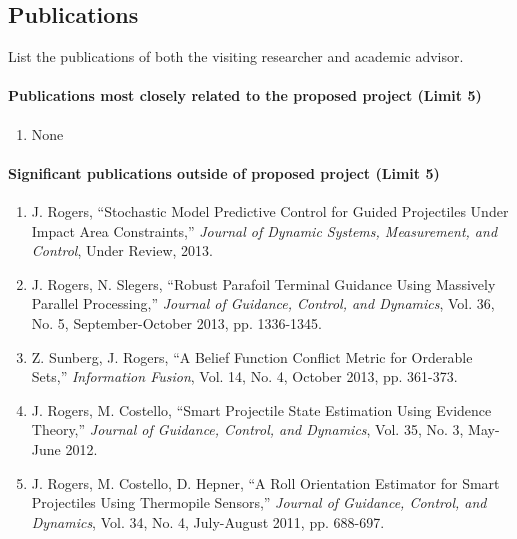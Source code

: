 \documentclass{article}
\begin{document}
\subsection{Publications}
List the publications of both the visiting researcher and academic advisor.
\paragraph{Publications most closely related to the proposed project \textnormal{(Limit 5)}}
\begin{enumerate}
\item None
\end{enumerate}

\paragraph{Significant publications outside of proposed project \textnormal{(Limit 5)}}
\begin{enumerate}
\item J. Rogers, “Stochastic Model Predictive Control for Guided Projectiles Under Impact Area Constraints,” \textit{Journal of Dynamic Systems, Measurement, and Control}, Under Review, 2013.

\item J. Rogers, N. Slegers, “Robust Parafoil Terminal Guidance Using Massively Parallel Processing,” \textit{Journal of Guidance, Control, and Dynamics}, Vol. 36, No. 5, September-October 2013, pp. 1336-1345.

\item Z. Sunberg, J. Rogers, “A Belief Function Conflict Metric for Orderable Sets,” \textit{Information Fusion}, Vol. 14, No. 4, October 2013, pp. 361-373.

\item J. Rogers, M. Costello, “Smart Projectile State Estimation Using Evidence Theory,” \textit{Journal of Guidance, Control, and Dynamics}, Vol. 35, No. 3, May-June 2012.

\item J. Rogers, M. Costello, D. Hepner, “A Roll Orientation Estimator for Smart Projectiles Using Thermopile Sensors,” \textit{Journal of Guidance, Control, and Dynamics}, Vol. 34, No. 4, July-August 2011, pp. 688-697.

\end{enumerate}
\end{document}
